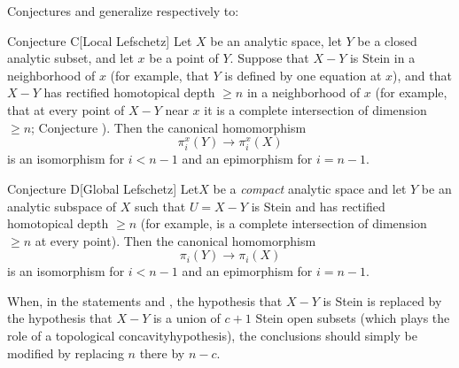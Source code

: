 Conjectures  and  generalize respectively to:

 \label{XIII.6.C}
\begin{enonce*}{Conjecture C}[\og Local Lefschetz\fg\ndemark]
Let $X$ be an analytic space, let $Y$ be a closed analytic subset, and let $x$ be a point of $Y$. Suppose that $X-Y$ is Stein in a neighborhood of $x$ (for example, that $Y$ is defined by one equation at $x$), and that $X-Y$ has rectified homotopical depth $\geq n$ in a neighborhood of $x$ (for example, that at every point of $X-Y$ near $x$ it is a complete intersection of dimension $\geq n$; \cf Conjecture ). Then the canonical homomorphism
$$
\pi_i^x(Y)\to\pi_i^x(X)
$$
is an isomorphism for $i<n-1$ and an epimorphism for $i=n-1$.
\end{enonce*}

 \label{XIII.6.D}
\begin{enonce*}{Conjecture D}[\og Global Lefschetz\fg\ndemark]
Let\pageoriginaled $X$ be a \emph{compact} analytic space and let $Y$ be an analytic subspace of $X$ such that $U=X-Y$ is Stein and has rectified homotopical depth $\geq n$ (for example, is a complete intersection of dimension $\geq n$ at every point). Then the canonical homomorphism
$$
\pi_i(Y)\to\pi_i(X)
$$
is an isomorphism for $i<n-1$ and an epimorphism for $i=n-1$.
\end{enonce*}

\begin{remarquestar}
When, in the statements  and , the hypothesis that $X-Y$ is Stein is replaced by the hypothesis that $X-Y$ is a union of $c+1$ Stein open subsets (which plays the role of a topological \og concavity\fg hypothesis), the conclusions should simply be modified by replacing $n$ there by $n-c$.
\end{remarquestar}

